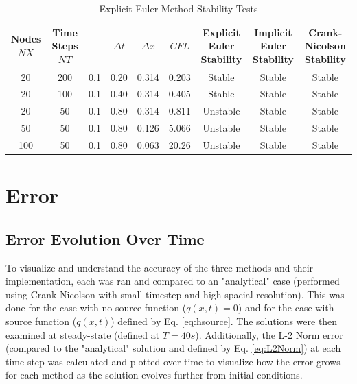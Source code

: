 \documentclass[10pt, letter, showtrims]{extarticle}
\begin{document}
		\FloatBarrier
		\begin{table}[h]
			\caption{Explicit Euler Method Stability Tests}
			\centering
			\begin{tabular}{|c|c|c|c|c|c|c|c|c|}
				\hline
				\makecell{Nodes \\ $NX$} & \makecell{Time Steps \\ $NT$} & \makecell{$K$} & $\Delta t$ & $\Delta x$ & $CFL$ & \makecell{Explicit Euler \\ Stability} & \makecell{Implicit Euler \\ Stability} & \makecell{Crank-Nicolson \\ Stability} \\
				\hline \rowcolor{Gray} 
				20  & 200 & 0.1 & 0.20 & 0.314 & 0.203 & Stable & Stable & Stable  \\
				\hline
				20  & 100 & 0.1 & 0.40 & 0.314 & 0.405 & Stable & Stable & Stable  \\
				\hline  \rowcolor{Gray} 
				20  & 50  & 0.1 & 0.80 & 0.314 & 0.811 & Unstable & Stable & Stable \\
				\hline 
				50  & 50  & 0.1 & 0.80 & 0.126 & 5.066 & Unstable & Stable & Stable \\
				\hline \rowcolor{Gray}
				100 & 50  & 0.1 & 0.80 & 0.063 & 20.26 & Unstable & Stable & Stable \\
				\hline
			\end{tabular}
			\label{tbl:stability}
		\end{table}
		\FloatBarrier
		
		\section{Error}
		
		\subsection{Error Evolution Over Time}

		\noindent
		To visualize and understand the accuracy of the three methods and their implementation, each was ran and compared to an "analytical" case (performed using Crank-Nicolson with small timestep and high spacial resolution). This was done for the case with no source function ($q(x,t) = 0$) and for the case with source function ($q(x, t)$) defined by Eq. \ref{eq:hsource}. The solutions were then examined at steady-state (defined at $T = 40 s$). Additionally, the L-2 Norm error (compared to the "analytical" solution and defined by Eq. \ref{eq:L2Norm}) at each time step was calculated and plotted over time to visualize how the error grows for each method as the solution evolves further from initial conditions.		
		
\end{document}

